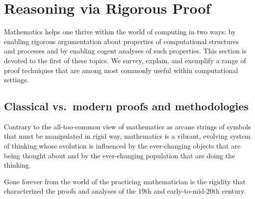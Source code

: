 \section{Reasoning via Rigorous Proof}
\label{sec:reasoning-via-proofs}

Mathematics helps one thrive within the world of computing in two
ways: by enabling rigorous argumentation about properties of
computational structures and processes and by enabling cogent analyses
of such properties.  This section is devoted to the first of these
topics.  We survey, explain, and exemplify a range of proof techniques
that are among most commonly useful within computational settings.

\subsection{Classical vs.~modern proofs and methodologies}
\label{sec:classical-v-modern-proofs}

Contrary to the all-too-common view of mathematics as arcane strings
of symbols that must be manipulated in rigid way, mathematics is a
vibrant, evolving system of thinking whose evolution is influenced by
the ever-changing objects that are being thought about and by the
ever-changing population that are doing the thinking.

Gone forever from the world of the practicing mathematician is the
rigidity that characterized the proofs and analyses of the 19th and
early-to-mid-20th century.
\bigskip

\noindent {}
\bigskip


